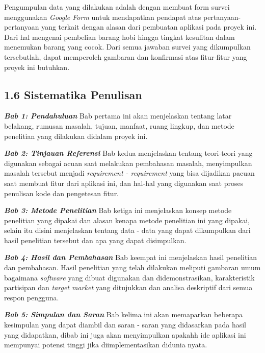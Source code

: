 \documentclass[a4paper]{article}
\begin{document}
Pengumpulan data yang dilakukan adalah dengan membuat form survei menggunakan \textit{Google Form} untuk mendapatkan pendapat atas pertanyaan-pertanyaan yang terkait dengan alasan dari pembuatan aplikasi pada proyek ini. Dari hal mengenai pembelian barang hobi hingga tingkat kesulitan dalam menemukan barang yang cocok. Dari semua jawaban survei yang dikumpulkan tersebutlah, dapat memperoleh gambaran dan konfirmasi atas fitur-fitur yang proyek ini butuhkan.

\subsection*{1.6 Sistematika Penulisan}
\textit{\textbf{Bab 1: Pendahuluan}} \newline
Bab pertama ini akan menjelaskan tentang latar belakang, rumusan masalah, tujuan, manfaat, ruang lingkup, dan metode penelitian yang dilakukan didalam proyek ini.

\textit{\textbf{Bab 2: Tinjauan Referensi}}\newline
Bab kedua menjelaskan tentang teori-teori yang digunakan sebagai acuan saat melakukan pembahasan masalah, menyimpulkan masalah tersebut menjadi \textit{requirement - requirement} yang bisa dijadikan pacuan saat membuat fitur dari aplikasi ini, dan hal-hal yang digunakan saat proses penulisan kode dan pengetesan fitur.

\textit{\textbf{Bab 3: Metode Penelitian}}\newline
Bab ketiga ini menjelaskan konsep metode penelitian yang dipakai dan alasan kenapa metode penelitian ini yang dipakai, selain itu disini menjelaskan tentang data - data yang dapat dikumpulkan dari hasil penelitian tersebut dan apa yang dapat disimpulkan.

\textit{\textbf{Bab 4: Hasil dan Pembahasan}}\newline
Bab keempat ini menjelaskan hasil penelitian dan pembahasan. Hasil penelitian yang telah dilakukan meliputi gambaran umum bagaimana \textit{software} yang dibuat digunakan dan didemonstrasikan, karakteristik partisipan dan \textit{target market} yang ditujukkan dan analisa deskriptif dari semua respon pengguna.

\textit{\textbf{Bab 5: Simpulan dan Saran}}\newline
Bab kelima ini akan memaparkan beberapa kesimpulan yang dapat diambil dan saran - saran yang didasarkan pada hasil yang didapatkan, dibab ini juga akan menyimpulkan apakahh ide aplikasi ini mempunyai potensi tinggi jika diimplementasikan didunia nyata.
\end{document}
